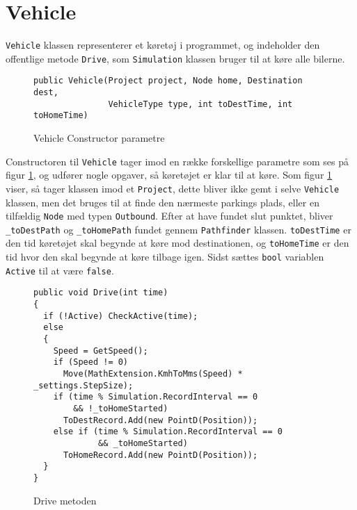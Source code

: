 \section{Vehicle}\label{Vehicle}
\texttt{Vehicle} klassen representerer et køretøj i programmet, og indeholder den offentlige metode \texttt{Drive}, som \texttt{Simulation} klassen bruger til at køre alle bilerne. 

\begin{figure}[H]
\begin{lstlisting}
public Vehicle(Project project, Node home, Destination dest, 
               VehicleType type, int toDestTime, int toHomeTime)
\end{lstlisting}
\caption{Vehicle Constructor parametre}\label{VehicleConstructor}
\end{figure}

Constructoren til \texttt{Vehicle} tager imod en række forskellige parametre som ses på figur \ref{VehicleConstructor}, og udfører nogle opgaver, så køretøjet er klar til at køre. Som figur \ref{VehicleConstructor} viser, så tager klassen imod et \texttt{Project}, dette bliver ikke gemt i selve \texttt{Vehicle} klassen, men det bruges til at finde den nærmeste parkings plads, eller en tilfældig \texttt{Node} med typen \texttt{Outbound}. Efter at have fundet slut punktet, bliver \texttt{\_toDestPath} og \texttt{\_toHomePath} fundet gennem \texttt{Pathfinder} klassen. \texttt{toDestTime} er den tid køretøjet skal begynde at køre mod destinationen, og \texttt{toHomeTime} er den tid hvor den skal begynde at køre tilbage igen. Sidst sættes \texttt{bool} variablen \texttt{Active} til at være \texttt{false}.

\begin{figure}[H]
\begin{lstlisting}
public void Drive(int time)
{
  if (!Active) CheckActive(time);
  else
  {
    Speed = GetSpeed();
    if (Speed != 0)
      Move(MathExtension.KmhToMms(Speed) * _settings.StepSize);
    if (time % Simulation.RecordInterval == 0 
        && !_toHomeStarted)
      ToDestRecord.Add(new PointD(Position));
    else if (time % Simulation.RecordInterval == 0 
             && _toHomeStarted)
      ToHomeRecord.Add(new PointD(Position));
  }
}
\end{lstlisting}
\caption{Drive metoden}\label{DriveCode}
\end{figure}

